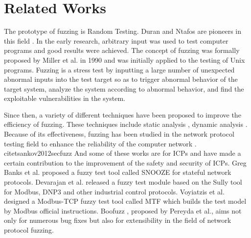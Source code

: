 \section{Related Works}
The prototype of fuzzing is Random Testing. Duran and Ntafos are pioneers in this field \cite{duran1984evaluation}. In the early research, arbitrary input was used to test computer programs and good results were achieved. The concept of fuzzing was formally proposed by Miller et al. \cite{miller1990empirical} in 1990 and was initially applied to the testing of Unix programs. Fuzzing is a stress test by inputting a large number of unexpected abnormal inputs into the test target so as to trigger abnormal behavior of the target system, analyze the system according to abnormal behavior, and find the exploitable vulnerabilities in the system.

Since then, a variety of different techniques have been proposed to improve the efficiency of fuzzing. These techniques include static analysis \cite{sparks2007automated} \cite{kinder2009abstract}, dynamic analysis \cite{hoschele2016mining} \cite{bastani2017synthesizing} \cite{kifetew2017generating}. Because of its effectiveness, fuzzing has been studied in the network protocol testing field to enhance the reliability of the computer network \cite{aitel2002introduction} \cite{amini2010sulley} %
\cite{eddington2011peach}. cite{tsankov2012secfuzz} \cite{chen2018iotfuzzer} 
And some of these works are for ICPs and have made a certain contribution to the improvement of the safety and security of ICPs. Greg Banks et al. proposed a fuzzy test tool called SNOOZE \cite{banks2006snooze} for stateful network protocols. Devarajan et al. \cite{devarajan2007unraveling} released a fuzzy test module based on the Sully tool for Modbus, DNP3 and other industrial control protocols. Voyiatzis et al. \cite{voyiatzis2015modbus} designed a Modbus-TCP fuzzy test tool called MTF which builds the test model by Modbus official instructions. Boofuzz \cite{pereyda2017boofuzz}, proposed by Pereyda et al., aims not only for numerous bug fixes but also for extensibility in the field of network protocol fuzzing.


